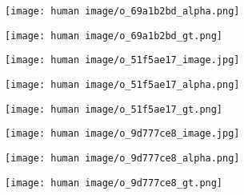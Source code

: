 \documentclass[10pt,twocolumn,letterpaper]{article}
\begin{document}
\begin{figure*}
  \centering
  \begin{subfigure}{0.16\linewidth}
    \centerline{\texttt{[image: human image/o\_69a1b2bd\_alpha.png]}}
    \label{fig:f_alpha}
  \end{subfigure}
  \centering
  \begin{subfigure}{0.16\linewidth}
    \centerline{\texttt{[image: human image/o\_69a1b2bd\_gt.png]}}
    \label{fig:f_gt}
  \end{subfigure}
\centering
  \begin{subfigure}{0.16\linewidth}
    \centerline{\texttt{[image: human image/o\_51f5ae17\_image.jpg]}}
    \label{fig:e_image}
  \end{subfigure}
  \centering
  \begin{subfigure}{0.16\linewidth}
    \centerline{\texttt{[image: human image/o\_51f5ae17\_alpha.png]}}
    \label{fig:e_alpha}
  \end{subfigure}
  \centering
  \begin{subfigure}{0.16\linewidth}
    \centerline{\texttt{[image: human image/o\_51f5ae17\_gt.png]}}
    \label{fig:e_gt}
  \end{subfigure}
\centering
  \begin{subfigure}{0.16\linewidth}
    \centerline{\texttt{[image: human image/o\_9d777ce8\_image.jpg]}}
    \label{fig:d_image}
  \end{subfigure}
  \centering
  \begin{subfigure}{0.16\linewidth}
    \centerline{\texttt{[image: human image/o\_9d777ce8\_alpha.png]}}
    \label{fig:d_alpha}
  \end{subfigure}
  \centering
  \begin{subfigure}{0.16\linewidth}
    \centerline{\texttt{[image: human image/o\_9d777ce8\_gt.png]}}
    \label{fig:d_gt}
  \end{subfigure}


\end{figure*}
\end{document}
